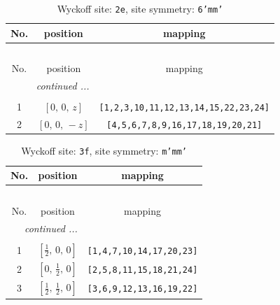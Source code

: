 \documentclass[fleqn,8pt]{jsarticle}
\begin{document}
\begin{longtable}{ccc}
\caption{Wyckoff site: {\tt 2e}, site symmetry: {\tt 6'mm'}}
 \\
 \hline \hline
No. & position & mapping \\ \hline \endfirsthead

\multicolumn{2}{l}{\tablename\ \thetable{}} \\
 \hline \hline
No. & position & mapping \\ \hline \endhead

 \hline \hline
\multicolumn{2}{r}{\footnotesize\it continued ...} \\ \endfoot

 \hline \hline
\multicolumn{2}{r}{} \\ \endlastfoot

1 & $\left[ 0,\, 0,\, z \right]$ & {\tt [1,2,3,10,11,12,13,14,15,22,23,24]} \\ \hline
2 & $\left[ 0,\, 0,\, - z \right]$ & {\tt [4,5,6,7,8,9,16,17,18,19,20,21]} \\
\end{longtable}
\renewcommand{\arraystretch}{1.2}
\begin{longtable}{ccc}
\caption{Wyckoff site: {\tt 3f}, site symmetry: {\tt m'mm'}}
 \\
 \hline \hline
No. & position & mapping \\ \hline \endfirsthead

\multicolumn{2}{l}{\tablename\ \thetable{}} \\
 \hline \hline
No. & position & mapping \\ \hline \endhead

 \hline \hline
\multicolumn{2}{r}{\footnotesize\it continued ...} \\ \endfoot

 \hline \hline
\multicolumn{2}{r}{} \\ \endlastfoot

1 & $\left[ \frac{1}{2},\, 0,\, 0 \right]$ & {\tt [1,4,7,10,14,17,20,23]} \\ \hline
2 & $\left[ 0,\, \frac{1}{2},\, 0 \right]$ & {\tt [2,5,8,11,15,18,21,24]} \\ \hline
3 & $\left[ \frac{1}{2},\, \frac{1}{2},\, 0 \right]$ & {\tt [3,6,9,12,13,16,19,22]} \\
\end{longtable}
\renewcommand{\arraystretch}{1.2}
\end{document}
